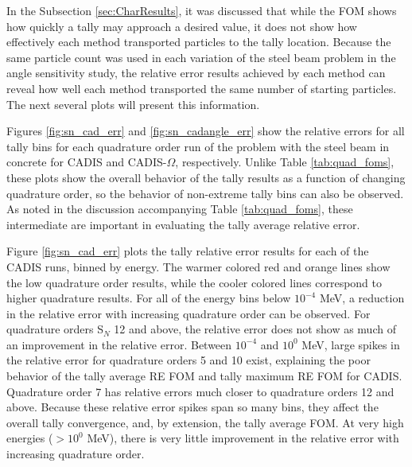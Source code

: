 In the Subsection \ref{sec:CharResults}, it was discussed that while the FOM
shows how quickly a tally may approach a desired value, it does not show how
effectively
each method transported particles to the tally location. Because the same
particle count was used in each variation of the steel beam problem in the angle
sensitivity study, the relative error results achieved by each method can reveal
how well each method transported the same number of starting particles.
The next several plots will present
this information.

Figures \ref{fig:sn_cad_err} and \ref{fig:sn_cadangle_err} show the relative
errors for all tally bins for each quadrature order run of the problem with the
steel beam in concrete for CADIS and CADIS-$\Omega$, respectively.
Unlike Table \ref{tab:quad_foms}, these plots show the
overall behavior of the tally results as a function of changing quadrature
order, so the behavior of non-extreme tally bins can also be observed. As noted
in the discussion accompanying Table \ref{tab:quad_foms}, these intermediate
are important in evaluating the tally average relative error.

Figure \ref{fig:sn_cad_err} plots the tally relative error results for each of
the CADIS runs, binned by energy. The warmer colored red and orange lines show
the low quadrature order results, while the cooler colored lines correspond to
higher quadrature results. For all of the energy bins below $10^{-4}$ MeV, a
reduction in the relative error with increasing quadrature order can be
observed. For quadrature orders S$_N$ 12 and above, the relative error does not
show as much of an improvement in the relative error. Between $10^{-4}$ and
$10^{0}$ MeV, large spikes in the relative error for quadrature orders 5 and 10
exist, explaining the poor behavior of the tally average RE FOM and tally
maximum RE FOM for CADIS.
Quadrature order 7 has relative errors much closer to quadrature orders
12 and above. Because these relative error spikes span so many bins, they affect
the overall tally convergence, and, by extension, the tally average FOM. At very
high energies ($> 10^{0}$ MeV), there is very little improvement in the relative
error with increasing quadrature order.

